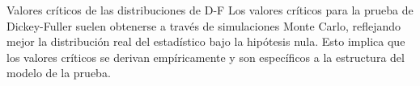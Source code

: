 \documentclass{beamer}
\begin{document}
\begin{frame}{Valores cr\'iticos de las distribuciones de D-F}
    Los valores críticos para la prueba de Dickey-Fuller suelen obtenerse a través de simulaciones Monte Carlo, reflejando mejor la distribución real del estadístico bajo la hipótesis nula. Esto implica que los valores críticos se derivan empíricamente y son específicos a la estructura del modelo de la prueba.
\end{frame}

\end{document}
